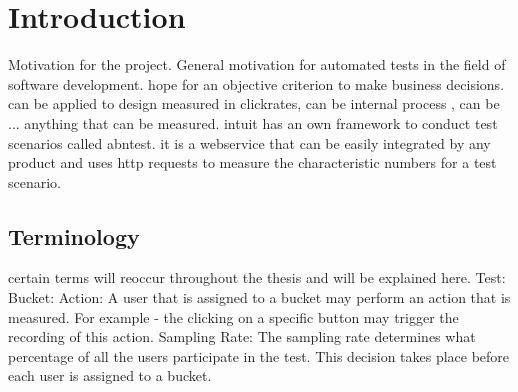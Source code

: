 \documentclass[main.tex]{subfiles}
\begin{document}
\chapter{Introduction}
Motivation for the project. General motivation for automated tests in the field of software development. hope for an objective criterion to make business decisions. can be applied to design measured in clickrates, can be internal process , can be ... anything that can be measured. intuit has an own framework to conduct test scenarios called abntest. it is a webservice that can be easily integrated by any product and uses http requests to measure the characteristic numbers for a test scenario.
\section{Terminology}
certain terms will reoccur throughout the thesis and will be explained here.
Test:
Bucket:
Action: A user that is assigned to a bucket may perform an action that is measured. For example - the clicking on a specific button may trigger the recording of this action. 
Sampling Rate: The sampling rate determines what percentage of all the users participate in the test. This decision takes place before each user is assigned to a bucket.
\end{document}
